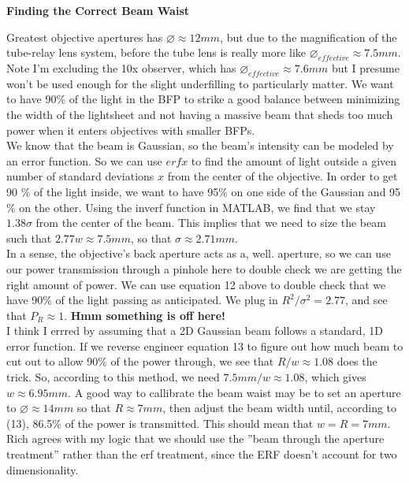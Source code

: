 \newpage
\begin{center}
    \textbf{Finding the Correct Beam Waist}
\end{center}
Greatest objective apertures has $\diameter\approx 12mm$, but due to the magnification of the tube-relay lens system, before the tube lens is really more like $\diameter_{effective} \approx 7.5mm$. {Note I'm excluding the 10x observer, which has $\diameter_{effective} \approx 7.6mm$ but I presume won't be used enough for the slight underfilling to particularly matter.} We want to have 90\% of the light in the BFP to strike a good balance between minimizing the width of the lightsheet and not having a massive beam that sheds too much power when it enters objectives with smaller BFPs.\\
We know that the beam is Gaussian, so the beam's intensity can be modeled by an error function. So we can use $erf{x}$ to find the amount of light outside a given number of standard deviations $x$ from the center of the objective. In order to get 90 \% of the light inside, we want to have 95\% on one side of the Gaussian and 95 \% on the other. Using the inverf function in MATLAB, we find that we stay $1.38\sigma$ from the center of the beam. This implies that we need to size the beam such that $2.77 w \approx 7.5mm$, so that $\sigma \approx 2.71mm$.\\
In a sense, the objective's back aperture acts as a, well. aperture, so we can use our power transmission through a pinhole here to double check we are getting the right amount of power. We can use equation 12 above to double check that we have 90\% of the light passing as anticipated. We plug in $R^2/\sigma^2=2.77$, and see that $P_R \approx 1$. \textbf{Hmm something is off here!}\\
I think I errred by assuming that a 2D Gaussian beam follows a standard, 1D error function. If we reverse engineer equation 13 to figure out how much beam to cut out to allow 90\% of the power through, we see that $R/w \approx 1.08$ does the trick. So, according to this method, we need $7.5mm/w\approx 1.08$, which gives $w\approx 6.95mm$. A good way to callibrate the beam waist may be to set an aperture to $\diameter \approx 14mm$ so that $R \approx 7mm$, then adjust the beam width until, according to (13), 86.5\% of the power is transmitted. This should mean that $w=R = 7mm$.\\
Rich agrees with my logic that we should use the ''beam through the aperture treatment'' rather than the erf treatment, since the ERF doesn't account for two dimensionality.
